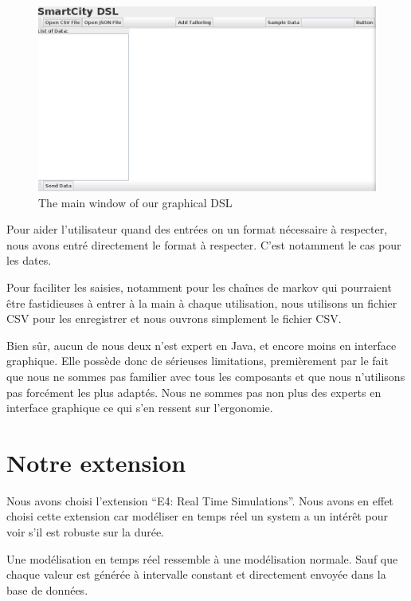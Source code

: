 \documentclass[11pt]{article}
\begin{document}
\begin{figure}
  \centering
  \includegraphics[width=\textwidth]{Figs/intro.png}
  \caption{The main window of our graphical DSL}
  \label{fig:intro}
\end{figure}


Pour aider l'utilisateur quand des entrées on un format nécessaire à respecter, nous avons entré directement le format à respecter. C'est notamment le cas pour les dates.

Pour faciliter les saisies, notamment pour les chaînes de markov qui pourraient être fastidieuses à entrer à la main à chaque utilisation, nous utilisons un fichier CSV pour les enregistrer et nous ouvrons simplement le fichier CSV.

Bien sûr, aucun de nous deux n'est expert en Java, et encore moins en interface graphique. Elle possède donc de sérieuses limitations, premièrement par le fait que nous ne sommes pas familier avec tous les composants et que nous n'utilisons pas forcément les plus adaptés. Nous ne sommes pas non plus des experts en interface graphique ce qui s'en ressent sur l'ergonomie.



\section{Notre extension}


Nous avons choisi l'extension ``E4: Real Time Simulations''. Nous avons en effet choisi cette extension car modéliser en temps réel un system a un intérêt pour voir s'il est robuste sur la durée.

Une modélisation en temps réel ressemble à une modélisation normale. Sauf que chaque valeur est générée à intervalle constant et directement envoyée dans la base de données.
\end{document}
